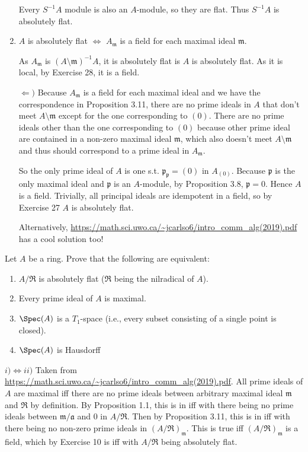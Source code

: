 \documentclass[a4paper]{exam}
\begin{document}
\begin{questions}
\begin{enumerate}
	\begin{solution}
		Every $S^{-1}A $ module is also an $A $-module, so they are flat.
		Thus $S^{-1}A $ is absolutely flat.
	\end{solution}
	\item $A $ is absolutely flat $\iff $ $A_ \mathfrak{m}$ is a field for each maximal ideal $\mathfrak{m} $.
	\begin{solution}
		As $A_ \mathfrak{m} $ is $(A \setminus \mathfrak{m})^{-1}A $, it is absolutely flat is $A $ is absolutely flat.
		As it is local, by Exercise 28, it is a field.

		$\Leftarrow) $ Because $A_{ \mathfrak{m}} $ is a field for each maximal ideal and we have the correspondence in Proposition 3.11, there are no prime ideals in $A $ that don't meet $A \setminus \mathfrak{m} $ except for the one corresponding to $(0) $.
		There are no prime ideals other than the one corresponding to $(0) $ because other prime ideal are contained in a non-zero maximal ideal $\mathfrak{m} $, which also doesn't meet $A\setminus \mathfrak{m} $ and thus should correspond to a prime ideal in $A_{\mathfrak{m}} $.

		So the only prime ideal of $A $ is one s.t. $\mathfrak{p}_{\mathfrak{p}} = (0) $ in $A_{(0)} $.
		Because $\mathfrak{p} $ is the only maximal ideal and $\mathfrak{p} $ is an $A $-module, by Proposition 3.8, $\mathfrak{p} = 0 $.
		Hence $A $ is a field.
		Trivially, all principal ideals are idempotent in a field, so by Exercise 27 $A $ is absolutely flat.

		Alternatively, \url{https://math.sci.uwo.ca/~jcarlso6/intro_comm_alg(2019).pdf} has a cool solution too!
	\end{solution}
\end{enumerate}
\question Let $A $ be a ring. Prove that the following are equivalent:
\begin{enumerate}
	\item $A / \mathfrak{R} $ is absolutely flat ($\mathfrak{R} $ being the nilradical of $A $).
	\item Every prime ideal of $A $ is maximal.
	\item $\Spec(A) $ is a $T_{1} $-space (i.e., every subset consisting of a single point is closed).
	\item $\Spec(A) $ is Hausdorff
\end{enumerate}
\begin{solution}
	$i)\iff ii) $ 
	Taken from \url{https://math.sci.uwo.ca/~jcarlso6/intro_comm_alg(2019).pdf}.
	All prime ideals of $A $ are maximal iff there are no prime ideals between arbitrary maximal ideal $\mathfrak{m} $ and $\mathfrak{R} $ by definition.
	By Proposition 1.1, this is in iff with there being no prime ideals between $\mathfrak{m} / \mathfrak{a} $ and $0 $ in $A / \mathfrak{R} $.
	Then by Proposition 3.11, this is in iff with there being no non-zero prime ideals in $(A / \mathfrak{R})_{\mathfrak{m}} $.
	This is true iff $(A / \mathfrak{R})_{\mathfrak{m}} $ is a field, which by Exercise 10 is iff with $A / \mathfrak{R}$ being absolutely flat.


\end{solution}
\end{questions}
\end{document}
